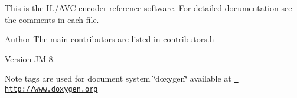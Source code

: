 This is the H./\+A\+VC encoder reference software. For detailed documentation see the comments in each file.

\begin{DoxyAuthor}{Author}
The main contributors are listed in contributors.\+h
\end{DoxyAuthor}
\begin{DoxyVersion}{Version}
JM 8.
\end{DoxyVersion}
\begin{DoxyNote}{Note}
tags are used for document system \char`\"{}doxygen\char`\"{} available at \href{http://www.doxygen.org}{\texttt{ http\+://www.\+doxygen.\+org}} 
\end{DoxyNote}
